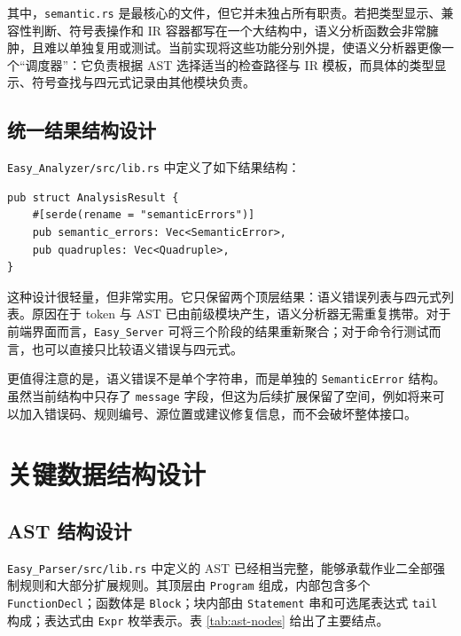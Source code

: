 \documentclass[UTF8,a4paper,12pt]{ctexart}
\newcommand{\pkg}[1]{\texttt{#1}}
\begin{document}
其中，\pkg{semantic.rs} 是最核心的文件，但它并未独占所有职责。若把类型显示、兼容性判断、符号表操作和 IR 容器都写在一个大结构中，语义分析函数会非常臃肿，且难以单独复用或测试。当前实现将这些功能分别外提，使语义分析器更像一个“调度器”：它负责根据 AST 选择适当的检查路径与 IR 模板，而具体的类型显示、符号查找与四元式记录由其他模块负责。

\subsection{统一结果结构设计}

\pkg{Easy\_Analyzer/src/lib.rs} 中定义了如下结果结构：

\begin{lstlisting}[style=textStyle,caption={分析结果结构}]
pub struct AnalysisResult {
    #[serde(rename = "semanticErrors")]
    pub semantic_errors: Vec<SemanticError>,
    pub quadruples: Vec<Quadruple>,
}
\end{lstlisting}

这种设计很轻量，但非常实用。它只保留两个顶层结果：语义错误列表与四元式列表。原因在于 token 与 AST 已由前级模块产生，语义分析器无需重复携带。对于前端界面而言，\pkg{Easy\_Server} 可将三个阶段的结果重新聚合；对于命令行测试而言，也可以直接只比较语义错误与四元式。

更值得注意的是，语义错误不是单个字符串，而是单独的 \pkg{SemanticError} 结构。虽然当前结构中只存了 \pkg{message} 字段，但这为后续扩展保留了空间，例如将来可以加入错误码、规则编号、源位置或建议修复信息，而不会破坏整体接口。

\section{关键数据结构设计}

\subsection{AST 结构设计}

\pkg{Easy\_Parser/src/lib.rs} 中定义的 AST 已经相当完整，能够承载作业二全部强制规则和大部分扩展规则。其顶层由 \pkg{Program} 组成，内部包含多个 \pkg{FunctionDecl}；函数体是 \pkg{Block}；块内部由 \pkg{Statement} 串和可选尾表达式 \pkg{tail} 构成；表达式由 \pkg{Expr} 枚举表示。表 \ref{tab:ast-nodes} 给出了主要结点。
\end{document}
